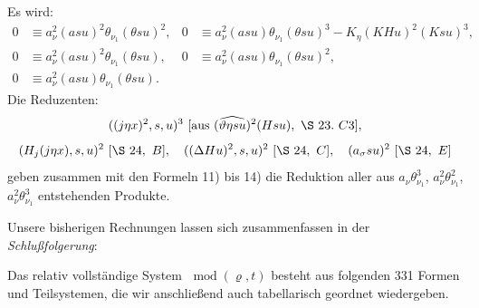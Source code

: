 \documentclass[11pt]{article}
\newcommand{\D}{\Delta}
\newcommand{\R}{\varrho}
\newcommand{\modu}[1]{\;\operatorname{mod} #1}
\begin{document}
Es wird:
\begin{align*}
0&\equiv a_\nu^2(asu)^2\theta_{\nu_1}(\theta su)^2,
&0&\equiv a_\nu^2(asu)\theta_{\nu_1}(\theta su)^3-K_\eta(KHu)^2(Ksu)^3,\\
0&\equiv a_\nu^2(asu)^2\theta_{\nu_1}(\theta su),
&0&\equiv a_\nu^2(asu)\theta_{\nu_1}(\theta su)^2,\\
0&\equiv a_\nu^2(asu)\theta_{\nu_1}(\theta su).
\end{align*}
Die Reduzenten:
\[
 ((j\eta x)^2,s,u)^3\ [\hbox{aus }(\widehat{\vartheta\eta su})^2(Hsu),\ \S\ 23.\ C3],
\]
\[
(H_j(j\eta x),s,u)^2\ [\S\ 24,\ B],
\quad ((\D Hu)^2,s,u)^2\ [\S\ 24,\ C],
\quad (a_\sigma su)^2\ [\S\ 24,\ E]
\]
geben zusammen mit den Formeln 11) bis 14) die Reduktion aller aus $a_\nu\theta_{\nu_1}^3$, $a_\nu^2\theta_{\nu_1}^2$, $a_\nu^2\theta_{\nu_1}^3$ entstehenden Produkte.

Unsere bisherigen Rechnungen lassen sich zusammenfassen in der \emph{Schlußfolgerung}:

Das relativ vollständige System $\modu{(\R,t)}$ besteht aus folgenden 331 Formen und Teilsystemen, die wir anschließend auch tabellarisch geordnet wiedergeben.
\end{document}
